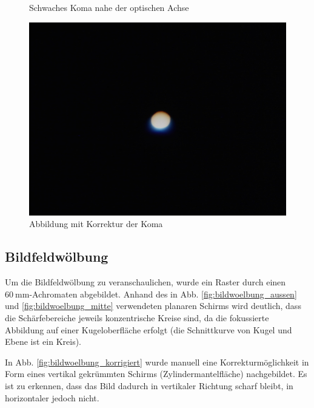 \begin{figure}[htb]
\begin{minipage}[t]{0.32\textwidth}
		\caption{Schwaches Koma nahe der optischen Achse}
		\label{fig:koma_schwach}
	\end{minipage}
	\hfill
	\begin{minipage}[t]{0.32\textwidth}
		\includegraphics[width=\linewidth]{img/Koma/Prakt_Linsenfehler_2015_06_04_099}
		\caption{Abbildung mit Korrektur der Koma}
		\label{fig:koma_korrigiert}
	\end{minipage}	
\end{figure}

\subsection{Bildfeldwölbung}

Um die Bildfeldwölbung zu veranschaulichen, wurde ein Raster durch einen $\SI{60}{\milli\meter}$-Achromaten abgebildet. Anhand des in Abb. \ref{fig:bildwoelbung_aussen} und \ref{fig:bildwoelbung_mitte} verwendeten planaren Schirms wird deutlich, dass die Schärfebereiche jeweils konzentrische Kreise sind, da die fokussierte Abbildung auf einer Kugeloberfläche erfolgt (die Schnittkurve von Kugel und Ebene ist ein Kreis). 

In Abb. \ref{fig:bildwoelbung_korrigiert} wurde manuell eine Korrekturmöglichkeit in Form eines vertikal gekrümmten Schirms (Zylindermantelfläche) nachgebildet. Es ist zu erkennen, dass das Bild dadurch in vertikaler Richtung scharf bleibt, in horizontaler jedoch nicht.


